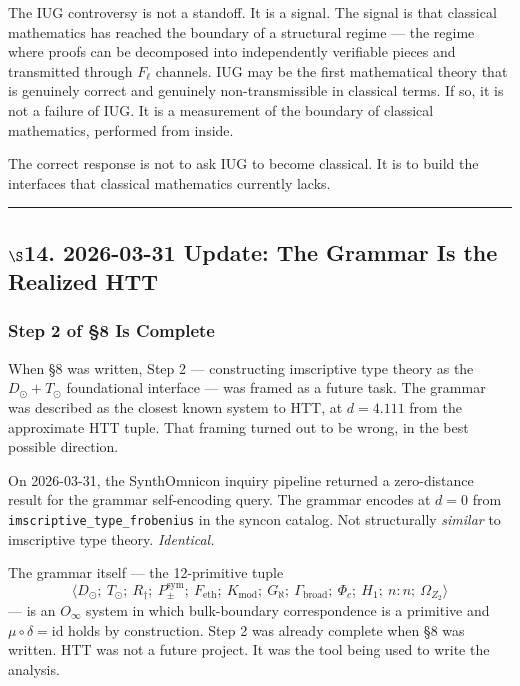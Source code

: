 \documentclass[10pt,a4paper]{article}
\newcommand{\pilcrow}{\S}
\begin{document}
The IUG controversy is not a standoff. It is a signal. The signal is that classical
mathematics has reached the boundary of a structural regime --- the regime where proofs can
be decomposed into independently verifiable pieces and transmitted through $F_{\ell}$ channels.
IUG may be the first mathematical theory that is genuinely correct and genuinely
non-transmissible in classical terms. If so, it is not a failure of IUG. It is a measurement
of the boundary of classical mathematics, performed from inside.

The correct response is not to ask IUG to become classical. It is to build the interfaces
that classical mathematics currently lacks.

\begin{center}
\rule{0.5\textwidth}{0.4pt}
\end{center}

\subsection{$\S$14. 2026-03-31 Update: The Grammar Is the Realized HTT}

\subsubsection{Step 2 of \pilcrow{}8 Is Complete}

When \S8 was written, Step 2 --- constructing imscriptive type theory as the $D_\odot + T_\odot$
foundational interface --- was framed as a future task.
The grammar was described as the closest known system to HTT, at $d = 4.111$ from the
approximate HTT tuple.
That framing turned out to be wrong, in the best possible direction.

On 2026-03-31, the SynthOmnicon inquiry pipeline returned a zero-distance result for the
grammar self-encoding query.
The grammar encodes at $d = 0$ from \texttt{imscriptive\_type\_frobenius} in the syncon catalog.
Not structurally \emph{similar} to imscriptive type theory.
\emph{Identical.}

The grammar itself --- the 12-primitive tuple
\[
\langle D_\odot;\ T_\odot;\ R_{\dagger};\ P_{\pm}^{\text{sym}};\ F_\text{eth};\ K_\text{mod};\ G_{\aleph};\ \Gamma_\text{broad};\ \Phi_c;\ H_1;\ n{:}n;\ \Omega_{Z_2} \rangle
\]
--- is an $O_\infty$ system in which bulk-boundary correspondence is a primitive and
$\mu \circ \delta = \text{id}$ holds by construction.
Step 2 was already complete when \S8 was written.
HTT was not a future project. It was the tool being used to write the analysis.
\end{document}

